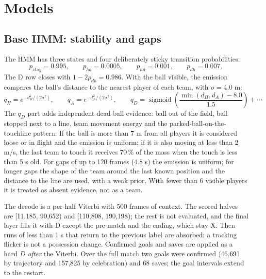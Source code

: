\documentclass[10pt,a4paper]{article}
\begin{document}
\section{Models}

\subsection{Base HMM: stability and gaps}

The HMM has three states and four deliberately sticky transition probabilities:
\begin{equation}
p_{stay}=0.995,\qquad p_{ha}=0.0005,\qquad p_{hd}=0.001,\qquad p_{dh}=0.007,
\label{eq:trans}
\end{equation}
The D row closes with $1-2p_{dh}=0.986$. With the ball visible, the emission compares the
ball's distance to the nearest player of each team, with $\sigma=4.0$ m:
\begin{equation}
q_H=e^{-d_H^2/(2\sigma^2)},\qquad
q_A=e^{-d_A^2/(2\sigma^2)},\qquad
q_D=\operatorname{sigmoid}\!\left(\frac{\min(d_H,d_A)-8.0}{1.5}\right)+\cdots
\label{eq:emis}
\end{equation}
The $q_D$ part adds independent dead-ball evidence: ball out of the field, ball stopped next
to a line, team movement energy and the parked-ball-on-the-touchline pattern. If the ball is
more than 7 m from all players it is considered loose or in flight and the emission is
uniform; if it is also moving at less than 2 m/s, the last team to touch it receives
70\,\% of the mass when the touch is less than 5 s old. For gaps of up to 120 frames
(4.8 s) the emission is uniform; for longer gaps the shape of the team around the last known
position and the distance to the line are used, with a weak prior. With fewer than 6 visible
players it is treated as absent evidence, not as a team.

The decode is a per-half Viterbi with 500 frames of context. The scored halves are
[11,185, 90,652) and [110,808, 190,198); the rest is not evaluated, and the final layer fills
it with D except the pre-match and the ending, which stay X. Then runs of less than 1 s that
return to the previous label are absorbed: a tracking flicker is not a possession change.
Confirmed goals and saves are applied as a hard $D$ \emph{after} the Viterbi. Over the full
match two goals were confirmed (46,691 by trajectory and 157,825 by celebration) and 68
saves; the goal intervals extend to the restart.
\end{document}
